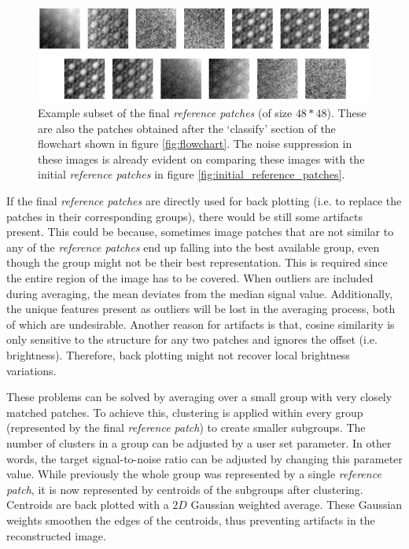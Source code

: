 \documentclass[fleqn,10pt]{wlscirep}
\begin{document}
	\begin{figure}
		\centering
		\includegraphics[scale=1.2]{./imgs/final_reference_patches.png}
		\caption{Example subset of the final \textit{reference patches} (of size $48*48$). These are also the patches obtained after the `classify' section of the flowchart shown in figure \ref{fig:flowchart}. The noise suppression in these images is already evident on comparing these images with the initial \textit{reference patches} in figure \ref{fig:initial_reference_patches}.}
		\label{fig:final_reference_patches}
	\end{figure} 

	
	If the final \textit{reference patches} are directly used for back plotting (i.e. to replace the patches in their corresponding groups), there would be still some artifacts present. This could be because, sometimes image patches that are not similar to any of the \textit{reference patches} end up falling into the best available group, even though the group might not be their best representation. This is required since the entire region of the image has to be covered. When outliers are included during averaging, the mean deviates from the median signal value. Additionally, the unique features present as outliers will be lost in the averaging process, both of which are undesirable. Another reason for artifacts is that, cosine similarity is only sensitive to the structure for any two patches and ignores the offset (i.e. brightness). Therefore, back plotting might not recover local brightness variations.
	
	These problems can be solved by averaging over a small group with very closely matched patches. To achieve this, clustering is applied within every group (represented by the final \textit{reference patch}) to create smaller subgroups. The number of clusters in a group can be adjusted by a user set parameter. In other words, the target signal-to-noise ratio can be adjusted by changing this parameter value. While previously the whole group was represented by a single \textit{reference patch}, it is now represented by centroids of the subgroups after clustering. Centroids are back plotted with a $2D$ Gaussian weighted average. These Gaussian weights smoothen the edges of the centroids, thus preventing artifacts in the reconstructed image. 
	
\end{document}
